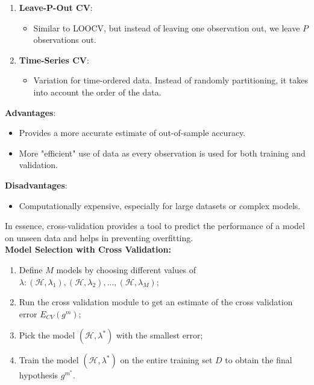 \documentclass{article}
\begin{document}
\begin{enumerate}
    \item \textbf{Leave-P-Out CV}:
    \begin{itemize}
        \item Similar to LOOCV, but instead of leaving one observation out, we leave \( P \) observations out.
    \end{itemize}

    \item \textbf{Time-Series CV}:
    \begin{itemize}
        \item Variation for time-ordered data. Instead of randomly partitioning, it takes into account the order of the data.
    \end{itemize}
\end{enumerate}

\textbf{Advantages}:
\begin{itemize}
    \item Provides a more accurate estimate of out-of-sample accuracy.
    \item More "efficient" use of data as every observation is used for both training and validation.
\end{itemize}

\textbf{Disadvantages}:
\begin{itemize}
    \item Computationally expensive, especially for large datasets or complex models.
\end{itemize}

In essence, cross-validation provides a tool to predict the performance of a model on unseen data and helps in preventing overfitting.\\

\textbf{Model Selection with Cross Validation:}
\begin{enumerate}
    \item Define $M$ models by choosing different values of $\lambda: (\mathcal{H}, \lambda_{1}), (\mathcal{H}, \lambda_{2}), ..., (\mathcal{H}, \lambda_{M})$;
    \item Run the cross validation module to get an estimate of the cross validation error $E_{CV}(g^{m})$;
    \item Pick the model $(\mathcal{H}, \lambda^{*})$ with the smallest error;
    \item Train the model $(\mathcal{H}, \lambda^{*})$ on the entire training set $D$ to obtain the final hypothesis $g^{m^{*}}$.
\end{enumerate}
\end{document}
